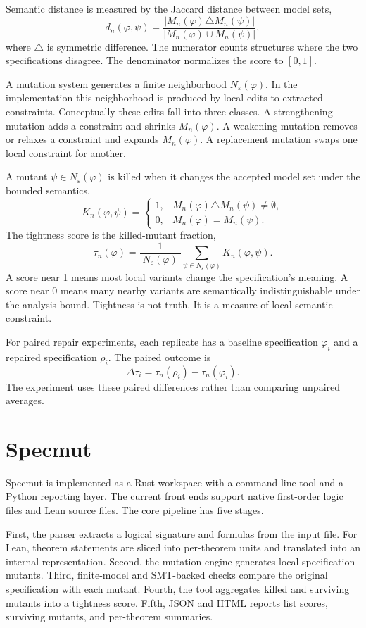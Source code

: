 \documentclass[11pt]{article}
\begin{document}
Semantic distance is measured by the Jaccard distance between model sets,
\[
d_n(\varphi,\psi)=\frac{|M_n(\varphi)\triangle M_n(\psi)|}{|M_n(\varphi)\cup M_n(\psi)|},
\]
where $\triangle$ is symmetric difference. The numerator counts structures where the two specifications disagree. The denominator normalizes the score to $[0,1]$.

A mutation system generates a finite neighborhood $N_\varepsilon(\varphi)$. In the implementation this neighborhood is produced by local edits to extracted constraints. Conceptually these edits fall into three classes. A strengthening mutation adds a constraint and shrinks $M_n(\varphi)$. A weakening mutation removes or relaxes a constraint and expands $M_n(\varphi)$. A replacement mutation swaps one local constraint for another.

A mutant $\psi\in N_\varepsilon(\varphi)$ is killed when it changes the accepted model set under the bounded semantics,
\[
K_n(\varphi,\psi)=
\begin{cases}
1,&M_n(\varphi)\triangle M_n(\psi)\neq\emptyset,\\
0,&M_n(\varphi)=M_n(\psi).
\end{cases}
\]
The tightness score is the killed-mutant fraction,
\[
\tau_n(\varphi)=\frac{1}{|N_\varepsilon(\varphi)|}
\sum_{\psi\in N_\varepsilon(\varphi)}K_n(\varphi,
\psi).
\]
A score near 1 means most local variants change the specification's meaning. A score near 0 means many nearby variants are semantically indistinguishable under the analysis bound. Tightness is not truth. It is a measure of local semantic constraint.

For paired repair experiments, each replicate has a baseline specification $\varphi_i$ and a repaired specification $\rho_i$. The paired outcome is
\[
\Delta\tau_i=\tau_n(\rho_i)-\tau_n(\varphi_i).
\]
The experiment uses these paired differences rather than comparing unpaired averages.

\section{Specmut}

Specmut is implemented as a Rust workspace with a command-line tool and a Python reporting layer. The current front ends support native first-order logic files and Lean source files. The core pipeline has five stages.

First, the parser extracts a logical signature and formulas from the input file. For Lean, theorem statements are sliced into per-theorem units and translated into an internal representation. Second, the mutation engine generates local specification mutants. Third, finite-model and SMT-backed checks compare the original specification with each mutant. Fourth, the tool aggregates killed and surviving mutants into a tightness score. Fifth, JSON and HTML reports list scores, surviving mutants, and per-theorem summaries.
\end{document}
